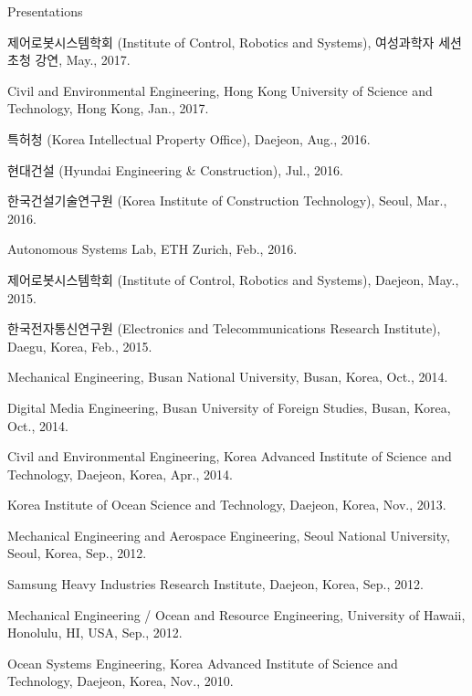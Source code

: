 \begin{rSection}{Presentations}

\begin{pubSubsection}{}
  \item 제어로봇시스템학회 (Institute of Control, Robotics and Systems), 여성과학자 세션 초청 강연, May., 2017. 
  \item Civil and Environmental Engineering, Hong Kong University of Science and Technology, Hong Kong, Jan., 2017.
  \item 특허청 (Korea Intellectual Property Office), Daejeon, Aug., 2016.
  \item 현대건설 (Hyundai Engineering \& Construction), Jul., 2016.
  \item 한국건설기술연구원 (Korea Institute of Construction Technology), Seoul, Mar., 2016.
  \item Autonomous Systems Lab, ETH Zurich, Feb., 2016.
  \item 제어로봇시스템학회 (Institute of Control, Robotics and Systems), Daejeon, May., 2015. 
  \item 한국전자통신연구원 (Electronics and Telecommunications Research Institute), Daegu, Korea, Feb., 2015.
  \item Mechanical Engineering, Busan National University, Busan, Korea, Oct., 2014.
  \item Digital Media Engineering, Busan University of Foreign Studies, Busan, Korea, Oct., 2014.
  \item Civil and Environmental Engineering, Korea Advanced Institute of Science and Technology, Daejeon, Korea, Apr., 2014.
  \item Korea Institute of Ocean Science and Technology, Daejeon, Korea, Nov., 2013.
  \item Mechanical Engineering and Aerospace Engineering, Seoul National University, Seoul, Korea, Sep., 2012.
  \item Samsung Heavy Industries Research Institute, Daejeon, Korea, Sep., 2012.
  \item Mechanical Engineering / Ocean and Resource Engineering, University of Hawaii, Honolulu, HI, USA, Sep., 2012.
  \item Ocean Systems Engineering, Korea Advanced Institute of Science and Technology, Daejeon, Korea, Nov., 2010.
\end{pubSubsection}

\end{rSection}

